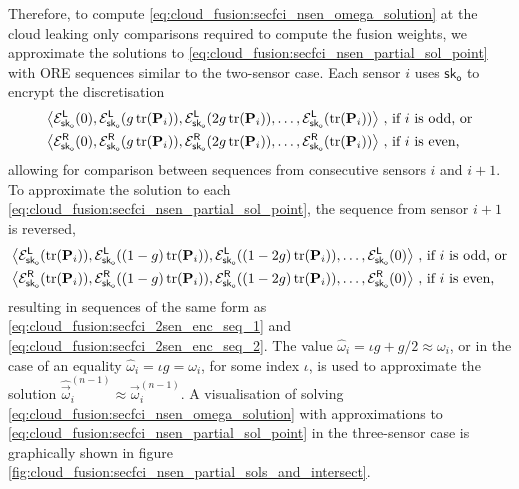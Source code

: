 Therefore, to compute \eqref{eq:cloud_fusion:secfci_nsen_omega_solution} at the cloud leaking only comparisons required to compute the fusion weights, we approximate the solutions to \eqref{eq:cloud_fusion:secfci_nsen_partial_sol_point} with ORE sequences similar to the two-sensor case. Each sensor $i$ uses $\mathsf{sk}_{\mathsf{o}}$ to encrypt the discretisation 
\begin{equation}\label{eq:cloud_fusion:secfci_nsen_enc_seqs}
    \begin{split}
        \left\langle\mathcal{E}^{\mathsf{L}}_{\mathsf{sk}_{\mathsf{o}}}(0), \mathcal{E}^{\mathsf{L}}_{\mathsf{sk}_{\mathsf{o}}}(g\tr(\mat{P}_i)), \mathcal{E}^{\mathsf{L}}_{\mathsf{sk}_{\mathsf{o}}}(2g\tr(\mat{P}_i)),\dots,\mathcal{E}^{\mathsf{L}}_{\mathsf{sk}_{\mathsf{o}}}(\tr(\mat{P}_i))\right\rangle\,,\ & \text{if } i \text{ is odd, or}\\
        \left\langle\mathcal{E}^{\mathsf{R}}_{\mathsf{sk}_{\mathsf{o}}}(0), \mathcal{E}^{\mathsf{R}}_{\mathsf{sk}_{\mathsf{o}}}(g\tr(\mat{P}_i)), \mathcal{E}^{\mathsf{R}}_{\mathsf{sk}_{\mathsf{o}}}(2g\tr(\mat{P}_i)),\dots,\mathcal{E}^{\mathsf{R}}_{\mathsf{sk}_{\mathsf{o}}}(\tr(\mat{P}_i))\right\rangle\,,\ & \text{if } i \text{ is even,}
    \end{split}
\end{equation}
allowing for comparison between sequences from consecutive sensors $i$ and $i+1$. To approximate the solution to each \eqref{eq:cloud_fusion:secfci_nsen_partial_sol_point}, the sequence from sensor $i+1$ is reversed,
\begin{equation}\label{eq:cloud_fusion:secfci_nsen_enc_seqs_reversed}
    \begin{split}
        \left\langle\mathcal{E}^{\mathsf{L}}_{\mathsf{sk}_{\mathsf{o}}}(\tr(\mat{P}_i)),\mathcal{E}^{\mathsf{L}}_{\mathsf{sk}_{\mathsf{o}}}((1-g)\tr(\mat{P}_i)), \mathcal{E}^{\mathsf{L}}_{\mathsf{sk}_{\mathsf{o}}}((1-2g)\tr(\mat{P}_i)),\dots,\mathcal{E}^{\mathsf{L}}_{\mathsf{sk}_{\mathsf{o}}}(0)\right\rangle\,,\ & \text{if } i \text{ is odd, or}\\
        \left\langle\mathcal{E}^{\mathsf{R}}_{\mathsf{sk}_{\mathsf{o}}}(\tr(\mat{P}_i)), \mathcal{E}^{\mathsf{R}}_{\mathsf{sk}_{\mathsf{o}}}((1-g)\tr(\mat{P}_i)), \mathcal{E}^{\mathsf{R}}_{\mathsf{sk}_{\mathsf{o}}}((1-2g)\tr(\mat{P}_i)),\dots,\mathcal{E}^{\mathsf{R}}_{\mathsf{sk}_{\mathsf{o}}}(0)\right\rangle\,,\ & \text{if } i \text{ is even,}
    \end{split}
\end{equation}
resulting in sequences of the same form as \eqref{eq:cloud_fusion:secfci_2sen_enc_seq_1} and \eqref{eq:cloud_fusion:secfci_2sen_enc_seq_2}. The value $\hat{\omega}_i = \iota g + g/2 \approx \omega_i$, or in the case of an equality $\hat{\omega}_i = \iota g = \omega_i$, for some index $\iota$, is used to approximate the solution $\hat{\vec{\omega}}_i^{(n-1)} \approx \vec{\omega}_i^{(n-1)}$. A visualisation of solving \eqref{eq:cloud_fusion:secfci_nsen_omega_solution} with approximations to \eqref{eq:cloud_fusion:secfci_nsen_partial_sol_point} in the three-sensor case is graphically shown in figure \ref{fig:cloud_fusion:secfci_nsen_partial_sols_and_intersect}.

